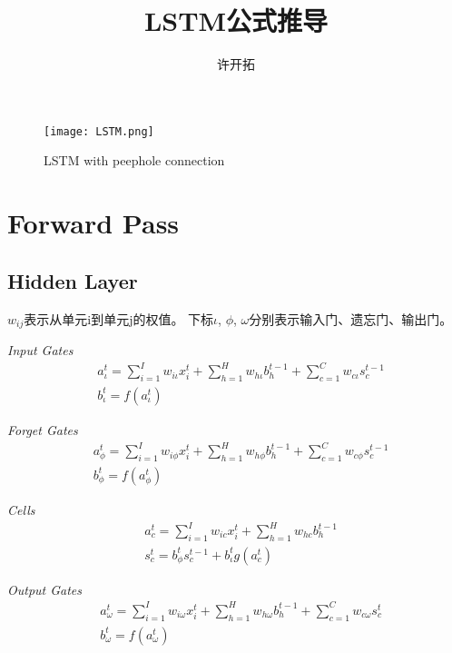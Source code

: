 \documentclass[a4paper,11pt,titlepage,UTF8]{article}
\title{LSTM公式推导}
\author{许开拓}
\date{}
\begin{document}
    \maketitle

    \begin{figure}[H]
    \begin{center}
      \texttt{[image: LSTM.png]}
      \caption{LSTM with peephole connection}\label{figure1_png}
    \end{center}
    \end{figure}


    \section{Forward Pass}
        \subsection{Hidden Layer}
        $w_{ij}$表示从单元i到单元j的权值。
        下标$\iota$, $\phi$, $\omega$分别表示输入门、遗忘门、输出门。

        \emph{Input Gates}
        \begin{align}
        & a_\iota^t=\sum_{i=1}^Iw_{i\iota}x_i^t+\sum_{h=1}^Hw_{h\iota}b_h^{t-1}+\sum_{c=1}^Cw_{c\iota}s_c^{t-1} \\
        & b_\iota^t=f(a_\iota^t)
        \end{align}

        \emph{Forget Gates}
        \begin{align}
        & a_\phi^t=\sum_{i=1}^Iw_{i\phi}x_i^t+\sum_{h=1}^Hw_{h\phi}b_h^{t-1}+\sum_{c=1}^Cw_{c\phi}s_c^{t-1} \\
        & b_\phi^t=f(a_\phi^t)
        \end{align}

        \emph{Cells}
        \begin{align}
        & a_c^t=\sum_{i=1}^Iw_{ic}x_i^t+\sum_{h=1}^Hw_{hc}b_h^{t-1} \\
        & s_c^t=b_\phi^t s_c^{t-1} + b_\iota^tg(a_c^t)
        \end{align}

        \emph{Output Gates}
        \begin{align}
        & a_\omega^t=\sum_{i=1}^Iw_{i\omega}x_i^t+\sum_{h=1}^Hw_{h\omega}b_h^{t-1}+\sum_{c=1}^Cw_{c\omega}s_c^{t} \\
        & b_\omega^t=f(a_\omega^t)
        \end{align}
\end{document}
